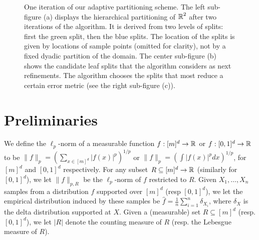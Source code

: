 \documentclass[final,12pt]{colt2018} %
\newcommand{\fhat}{\widehat{f}}
\begin{document}
 \begin{figure}
   \centering
   \hfill
   \hfill
   \caption{One iteration of our adaptive partitioning scheme.
   The left sub-figure (a) displays the hierarchical partitioning of $\operatorname{\mathbb{R}}^2$ after two iterations of the algorithm.
   It is derived from two levels of splits: first the green split, then the blue splits.
   The location of the splits is given by locations of sample points (omitted for clarity), not by a fixed dyadic partition of the domain.
   The center sub-figure (b) shows the candidate leaf splits that the algorithm considers as next refinements.
 The algorithm chooses the splits that most reduce a certain error metric (see the right sub-figure (c)). }
 \end{figure}


\section{Preliminaries}
We define the $\ell_p$-norm of a measurable function 
$f: [m]^d \to \operatorname{\mathbb{R}}$ or $f: [0, 1]^d \to \operatorname{\mathbb{R}}$ to be $\| f \|_p = \left( \sum_{x \in [m]^d} |f(x)|^p \right)^{1 / p}$ 
or $\| f \|_p = \left( \int |f (x)|^p dx \right)^{1 / p}$, for $[m]^d$ and $[0, 1]^d$ respectively.
For any subset $R \subseteq [m]^d \to \operatorname{\mathbb{R}}$ (similarly for $[0, 1]^d$), we let $\| f \|_{p, R}$ be the $\ell_p$-norm of $f$ restricted to $R$.
Given $X_1, \ldots, X_n$ samples from a distribution $f$ supported over $[m]^d$ (resp $[0, 1]^d$), 
we let the empirical distribution induced by these samples be 
$\fhat = \frac{1}{n} \sum_{i = 1}^n \delta_{X_i}$, where $\delta_X$ 
is the delta distribution supported at $X$.
Given a (measurable) set $R \subseteq [m]^d$ (resp. $[0, 1]^d$), we let $|R|$ denote the counting measure of $R$ (resp. the Lebesgue measure of $R$).
\end{document}
